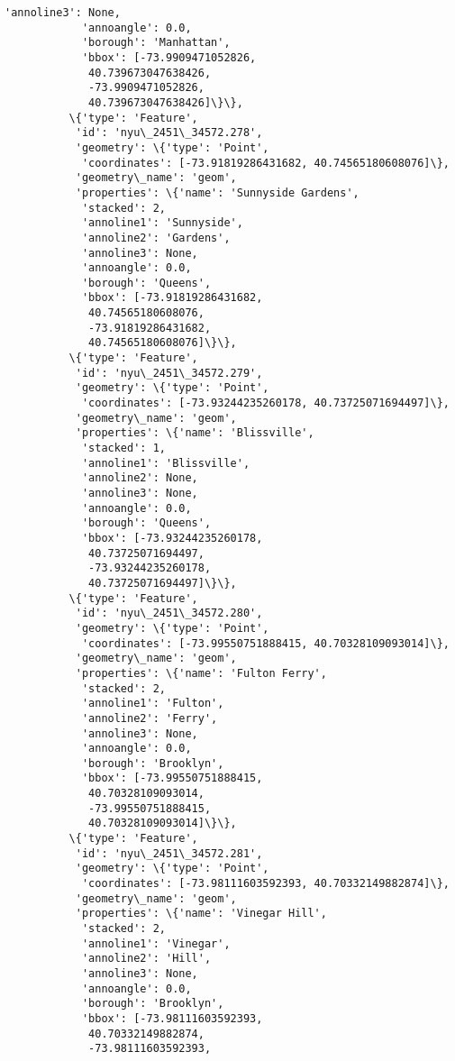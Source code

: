 \documentclass[11pt]{article}
\begin{document}
\begin{Verbatim}[commandchars=\\\{\}]
            'annoline3': None,
            'annoangle': 0.0,
            'borough': 'Manhattan',
            'bbox': [-73.9909471052826,
             40.739673047638426,
             -73.9909471052826,
             40.739673047638426]\}\},
          \{'type': 'Feature',
           'id': 'nyu\_2451\_34572.278',
           'geometry': \{'type': 'Point',
            'coordinates': [-73.91819286431682, 40.74565180608076]\},
           'geometry\_name': 'geom',
           'properties': \{'name': 'Sunnyside Gardens',
            'stacked': 2,
            'annoline1': 'Sunnyside',
            'annoline2': 'Gardens',
            'annoline3': None,
            'annoangle': 0.0,
            'borough': 'Queens',
            'bbox': [-73.91819286431682,
             40.74565180608076,
             -73.91819286431682,
             40.74565180608076]\}\},
          \{'type': 'Feature',
           'id': 'nyu\_2451\_34572.279',
           'geometry': \{'type': 'Point',
            'coordinates': [-73.93244235260178, 40.73725071694497]\},
           'geometry\_name': 'geom',
           'properties': \{'name': 'Blissville',
            'stacked': 1,
            'annoline1': 'Blissville',
            'annoline2': None,
            'annoline3': None,
            'annoangle': 0.0,
            'borough': 'Queens',
            'bbox': [-73.93244235260178,
             40.73725071694497,
             -73.93244235260178,
             40.73725071694497]\}\},
          \{'type': 'Feature',
           'id': 'nyu\_2451\_34572.280',
           'geometry': \{'type': 'Point',
            'coordinates': [-73.99550751888415, 40.70328109093014]\},
           'geometry\_name': 'geom',
           'properties': \{'name': 'Fulton Ferry',
            'stacked': 2,
            'annoline1': 'Fulton',
            'annoline2': 'Ferry',
            'annoline3': None,
            'annoangle': 0.0,
            'borough': 'Brooklyn',
            'bbox': [-73.99550751888415,
             40.70328109093014,
             -73.99550751888415,
             40.70328109093014]\}\},
          \{'type': 'Feature',
           'id': 'nyu\_2451\_34572.281',
           'geometry': \{'type': 'Point',
            'coordinates': [-73.98111603592393, 40.70332149882874]\},
           'geometry\_name': 'geom',
           'properties': \{'name': 'Vinegar Hill',
            'stacked': 2,
            'annoline1': 'Vinegar',
            'annoline2': 'Hill',
            'annoline3': None,
            'annoangle': 0.0,
            'borough': 'Brooklyn',
            'bbox': [-73.98111603592393,
             40.70332149882874,
             -73.98111603592393,

\end{Verbatim}
\end{document}
